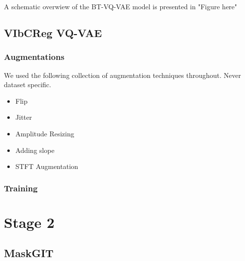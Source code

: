 \documentclass[../../thesis.tex]{subfiles}
\begin{document}
A schematic overwiew of the BT-VQ-VAE model is presented in "Figure here"

\subsection{VIbCReg VQ-VAE}

\subsubsection{Augmentations}
We used the following collection of augmentation techniques throughout. Never dataset specific.
\begin{itemize}
    \item Flip
    \item Jitter
    \item Amplitude Resizing
    \item Adding slope
    \item STFT Augmentation
\end{itemize}

\subsubsection{Training}

\section{Stage 2}

\subsection{MaskGIT}
\end{document}
